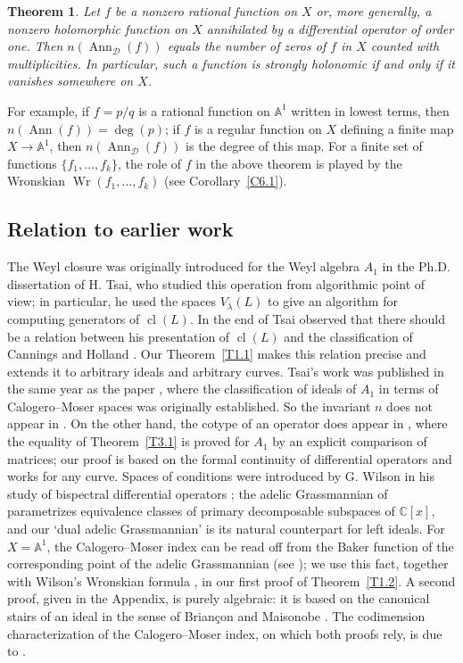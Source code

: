 \documentclass[11pt,reqno]{amsart}
\theoremstyle{plain}
\newtheorem{theorem}{Theorem}[section]
\theoremstyle{definition}
\theoremstyle{remark}
\numberwithin{equation}{section}
\newcommand{\cD}{\mathcal{D}}
\newcommand{\C}{\mathbb{C}}
\newcommand{\A}{\mathbb{A}}
\DeclareMathOperator{\Ann}{Ann}
\DeclareMathOperator{\cl}{cl}
\DeclareMathOperator{\Wr}{Wr}
\begin{document}
\begin{theorem}
\label{T1.4}
Let $f$ be a nonzero rational function on $X$ or, more generally, a nonzero holomorphic function
on $X$ annihilated by a differential operator of order one. Then $n(\Ann_{\cD}(f))$ equals the
number of zeros of $f$ in $X$ counted with multiplicities. In particular, such a function is
strongly holonomic if and only if it vanishes somewhere on $X$.
\end{theorem}

For example, if $f = p/q$ is a rational function on $\A^1$ written in lowest terms, then
$n(\Ann(f)) = \deg(p)$; if $f$ is a regular function on $X$ defining a finite map
$X \to \A^1$, then $n(\Ann_{\cD}(f))$ is the degree of this map. For a finite set
of functions $\{f_1, \ldots, f_k\}$, the role of $f$ in the above theorem is 
played by the Wronskian $\Wr(f_1, \ldots, f_k)$ (see Corollary~\ref{C6.1}).

\subsection*{Relation to earlier work} The Weyl closure was originally 
introduced for the Weyl algebra $A_1$ in the Ph.D. dissertation \cite{Tsai} of H. Tsai, who studied this operation from algorithmic point of view; in particular, he used the spaces $V_\lambda(L)$ to give an algorithm for computing generators of $\cl(L)$. In the end of \cite{Tsai} Tsai observed that there should be a relation between his presentation of $\cl(L)$ and the classification of Cannings and Holland \cite{CanningsHolland1994}. Our Theorem~\ref{T1.1} makes this
relation precise and extends it to arbitrary ideals and arbitrary curves. Tsai's work was published in the same year as the paper \cite{BerestWilson00}, where the classification of ideals of $A_1$ in terms of Calogero--Moser spaces was originally established. 
So the invariant $n$ does not appear in \cite{Tsai}. On the other hand, the cotype of an operator does appear in \cite{Tsai}, where
the equality of Theorem~\ref{T3.1} is proved for $A_1$ by an explicit comparison of matrices; our
proof is based on the formal continuity of differential operators and works for any curve.
Spaces of conditions were introduced by G. Wilson in his study of bispectral differential operators
\cite{Wilson1993}; the adelic Grassmannian of \cite{Wilson1993, Wilson1998} parametrizes
equivalence classes of primary decomposable subspaces of $\C[x]$, and our `dual adelic
Grassmannian' is its natural counterpart for left ideals. For $X = \A^1$, the Calogero--Moser
index can be read off from the Baker function of the corresponding point of the adelic
Grassmannian (see \cite{Wilson1998}); we use this fact, together with Wilson's Wronskian formula
\cite{Wilson1993}, in our first proof of Theorem~\ref{T1.2}. A second proof, given in the Appendix,
is purely algebraic: it is based on the canonical stairs of an ideal in the sense of Brian\c{c}on
and Maisonobe \cite{BM84}. The codimension characterization of the Calogero--Moser index, on
which both proofs rely, is due to \cite{BerestWilsonNC, BerestWilson09}.
\end{document}

